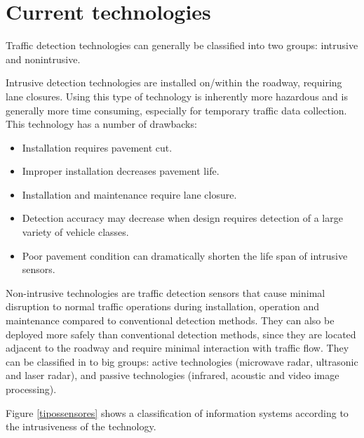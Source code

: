 \documentclass[preprint,authoryear,12pt]{elsarticle}
\begin{document}
\section{Current technologies}
\label{sec:current}
Traffic detection technologies can generally be classified into two groups: intrusive and nonintrusive.

Intrusive detection technologies are installed on/within the roadway, requiring lane closures. Using this type of technology is inherently more hazardous and is generally more time consuming, especially for temporary traffic data collection. This technology has a number of drawbacks:
\begin{itemize}
  \item Installation requires pavement cut.
  \item Improper installation decreases pavement life.
  \item Installation and maintenance require lane closure.
  \item Detection accuracy may decrease when design requires detection of a large variety of vehicle classes.
  \item Poor pavement condition can dramatically shorten the life span of intrusive sensors.
\end{itemize}

Non-intrusive technologies are traffic detection sensors that cause minimal disruption to normal traffic operations during installation, operation and maintenance compared to conventional detection methods. They can also be deployed more safely than conventional detection methods, since they are located adjacent to the roadway and require minimal interaction with traffic flow. They can be classified in to big groups: active technologies (microwave radar, ultrasonic and laser radar), and passive technologies (infrared, acoustic and video image processing). 

Figure \ref{tipossensores} shows a classification of information systems according to the intrusiveness of the technology.
\end{document}
